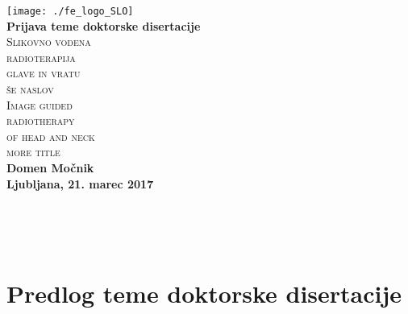 \documentclass[a4paper,twoside,11pt]{article}
\begin{document}
	\thispagestyle{empty}
	\par{ \noindent
		\begin{center}
			\texttt{[image: ./fe\_logo\_SLO]} \\ \vspace{2.0cm}
			\textbf{\Large Prijava teme doktorske disertacije} \\ \vspace{2.0cm}
			\textsc{\Huge Slikovno vodena} \\ \vspace{0.5cm}
			\textsc{\Huge radioterapija} \\ \vspace{0.5cm}
			\textsc{\Huge glave in vratu} \\ \vspace{0.5cm}
			\textsc{\Huge še naslov} \\ \vspace{1.0cm}
			\textsc{\Huge Image guided} \\ \vspace{0.5cm}
			\textsc{\Huge radiotherapy} \\ \vspace{0.5cm}
			\textsc{\Huge of head and neck} \\ \vspace{0.5cm}
			\textsc{\Huge more title} \\ \vspace{2.2cm}
			\textbf{\Large Domen Močnik} \\ \vspace{2.0cm}
			\textbf{\large Ljubljana, 21. marec 2017 }
		\end{center}
	}
	\newpage
	\thispagestyle{empty}
	~\\
	\newpage
	
	
	\thispagestyle{empty}
	\renewcommand\contentsname{Vsebina}
	\tableofcontents
	\newpage
	\thispagestyle{empty}
	~\\
	\newpage
	
	
	\section{Predlog teme doktorske disertacije}
\end{document}
